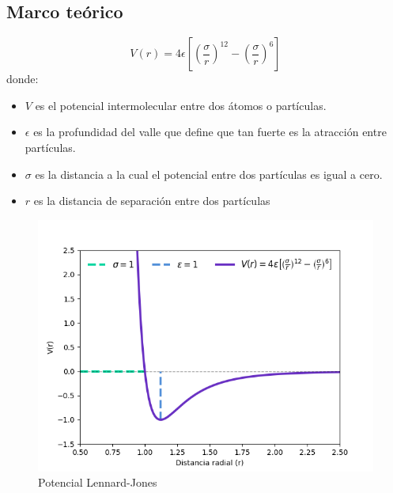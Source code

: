 \documentclass[12pt,letterpaper]{article}
\begin{document}
\begin{multicols}{2}
\section*{Marco teórico}
\begin{equation}
    \label{Potencial de Lennard-Jones}
    V(r) = 4 \epsilon \left[\left(\frac{\sigma}{r} \right)^{12} - \left(\frac{\sigma}{r} \right)^6 \right]
\end{equation}
donde:
\begin{itemize}
    \item $V$ es el potencial intermolecular entre dos átomos o partículas.
    \item $\epsilon$ es la profundidad del valle que define que tan fuerte es la atracción entre partículas.
    \item $\sigma$ es la distancia a la cual el potencial entre dos partículas es igual a cero.
    \item $r$ es la distancia de separación entre dos partículas
\end{itemize}
\begin{figure}[H]
    \centering
    \includegraphics[scale=0.45]{../Graphics/Potencial.png}
    \caption{Potencial Lennard-Jones}
    \label{pot-len-jones}
\end{figure}

\end{multicols}
\end{document}
